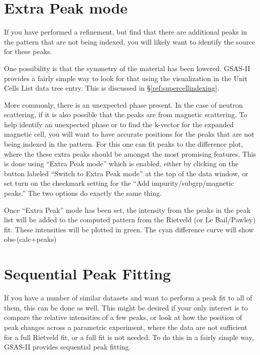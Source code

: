 \section{Extra Peak mode}\label{ref:extrapeak}
If you have performed a refinement, but find that there are additional peaks in the pattern that are not being indexed, you will likely want to identify the source for these peaks. 

One possibility is that the symmetry of the material has been lowered. GSAS-II provides a fairly simple way to look for that using the visualization in the Unit Cells List data tree entry.  This is discussed in \S\ref{ref:supercellindexing}.

More commonly, there is an unexpected phase present. In the case of neutron scattering, if it is also possible that the peaks are from magnetic scattering. To help identify an unexpected phase or to find the k-vector for the expanded magnetic cell, you will want to have accurate positions for the peaks that are not being indexed in the pattern. For this one can fit peaks to the difference plot, where the these extra peaks should be amongst the most promising features. This is done using ``Extra Peak mode'' which is enabled, either by clicking on the button labeled ``Switch to Extra Peak mode'' at the top of the data window, or set turn on the checkmark  setting for the ``Add impurity/subgrp/magnetic peaks.'' The two options do exactly the same thing. 

Once ``Extra Peak'' mode has been set, the intensity from the peaks in the peak list will be added to the computed pattern from the Rietveld (or Le Bail/Pawley) fit. These intensities will be plotted in green. The cyan difference curve will show obs-(calc+peaks)


\section{Sequential Peak Fitting}\label{ref:seqpeak}

If you have a number of similar datasets and want to perform a peak fit to all of them, this can be done as well. This might be desired if your only interest is to compare the relative intensities of a few peaks, or look at how the position of peak changes across a parametric experiment, where the data are not sufficient for a full Rietveld fit, or a full fit is not needed. To do this in a fairly simple way, GSAS-II provides sequential peak fitting. 

